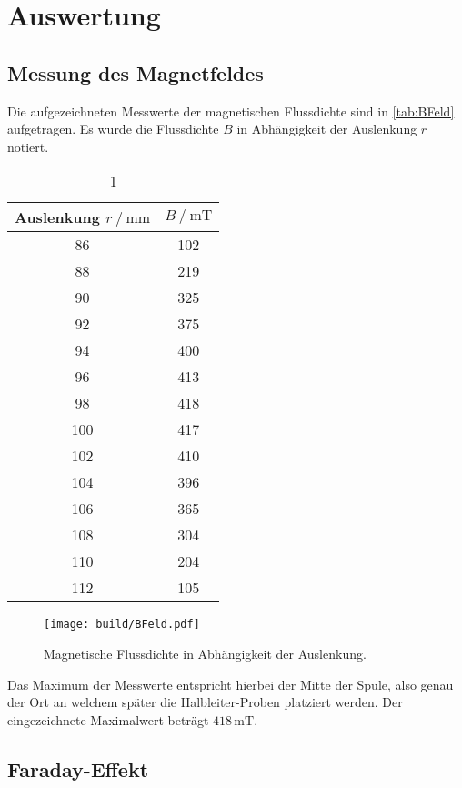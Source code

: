 \section{Auswertung}
\label{sec:Auswertung}




\subsection{Messung des Magnetfeldes}
\label{sec:AuswB}
Die aufgezeichneten Messwerte der magnetischen Flussdichte sind in \autoref{tab:BFeld} aufgetragen.
Es wurde die Flussdichte $B$ in Abhängigkeit der Auslenkung $r$ notiert.
\begin{table}
    \centering
    \caption{1}
    \begin{tabular}{c c  }
        \toprule
        Auslenkung $r \mathbin{/}\unit{\milli \meter}$& $B\mathbin{/}\unit{\milli \tesla}$\\
        \midrule
        86	&102\\
        88&	219\\
        90&	325\\
        92&	375\\
        94&	400\\
        96&	413\\
        98&	418\\
        100&417\\
        102&410\\
        104&396\\
        106&365\\
        108&304\\
        110&204\\
        112&105\\
        \bottomrule
    \end{tabular}
    \label{tab:BFeld}
\end{table}

\begin{figure}[H]
    \centering
    \texttt{[image: build/BFeld.pdf]}
    \caption{Magnetische Flussdichte in Abhängigkeit der Auslenkung.}
    \label{fig:BFeld}
\end{figure}
Das Maximum der Messwerte entspricht hierbei der Mitte der Spule, also genau der Ort an welchem später die Halbleiter-Proben platziert werden.
Der eingezeichnete Maximalwert beträgt $418\, \unit{\milli \tesla}$.

\subsection{Faraday-Effekt}


